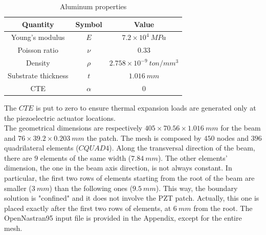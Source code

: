 \documentclass[twocolumn,a4paper,10pt,english]{article}
\def\arraystretch{2.5}
\begin{document}
	    	\begin{table}[H]
	    		\footnotesize
	    		\def\arraystretch{1.2}
	    		\centering
	    		\begin{tabular}{|c|c|c|}
	    			\hline
	    			\textbf{Quantity} & \textbf{Symbol} & \textbf{Value} \\
	    			\hline
	    			Young's modulus & $E$ & $7.2\times10^4~MPa$  \\
	    			\hline
	    			Poisson ratio & $\nu$ & $0.33$ \\ 
	    			\hline
	    			Density &$\rho$ & $2.758\times10^{-9}~ton/mm^3$ \\
	    			\hline
	    			Substrate thickness & $t$ & $1.016~mm$ \\
	    			\hline
	    			CTE & $\alpha$ & $0$ \\
	    			\hline
	    		\end{tabular}
	    		\caption{Aluminum properties}
	    		\label{tab:Alu}
	    	\end{table}
    	The $CTE$ is put to zero to ensure thermal expansion loads are generated only
    	at the piezoelectric actuator locations.\\
	    The geometrical dimensions are respectively $405\times70.56\times1.016~mm$ for the beam and $76\times39.2\times0.203~mm$ the patch. The mesh is composed by $450$ nodes and $396$ quadrilateral elements ($CQUAD4$). Along the transversal direction of the beam, there are $9$ elements of the same width ($7.84~mm$). The other elements' dimension, the one in the beam axis direction, is not always constant. In particular, the first two rows of elements starting from the root of the beam are smaller ($3~mm$) than the following ones ($9.5~mm$). This way, the boundary solution is "confined" and it does not involve the PZT patch. Actually, this one is placed exactly after the first two rows of elements, at $6~mm$ from the root. The OpenNastran95 input file is provided in the Appendix, except for the entire mesh. 
\end{document}
